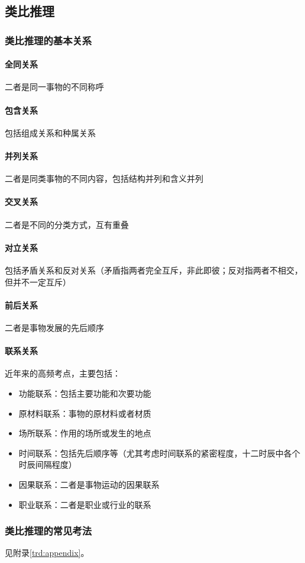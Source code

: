 \subsection{类比推理}

\subsubsection{类比推理的基本关系}

\paragraph{全同关系} 二者是同一事物的不同称呼

\paragraph{包含关系} 包括组成关系和种属关系

\paragraph{并列关系} 二者是同类事物的不同内容，包括结构并列和含义并列

\paragraph{交叉关系} 二者是不同的分类方式，互有重叠

\paragraph{对立关系} 包括矛盾关系和反对关系（矛盾指两者完全互斥，非此即彼；反对指两者不相交，但并不一定互斥）

\paragraph{前后关系} 二者是事物发展的先后顺序

\paragraph{联系关系} 近年来的高频考点，主要包括：

\begin{itemize}
    \item 功能联系：包括主要功能和次要功能
    \item 原材料联系：事物的原材料或者材质
    \item 场所联系：作用的场所或发生的地点
    \item 时间联系：包括先后顺序等（尤其考虑时间联系的紧密程度，十二时辰中各个时辰间隔程度）
    \item 因果联系：二者是事物运动的因果联系
    \item 职业联系：二者是职业或行业的联系
\end{itemize}

\subsubsection{类比推理的常见考法}

见附录\ref{trd:appendix}。

